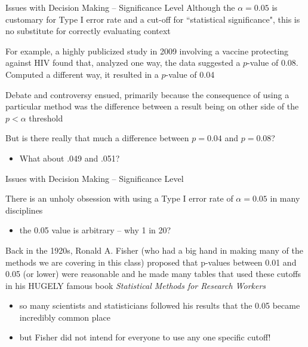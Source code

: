 \documentclass{beamer}
\begin{document}
\begin{frame}{Issues with Decision Making -- Significance Level}
Although the $\alpha = 0.05$ is customary for Type I error rate and a cut-off for ``statistical significance", this is no substitute for correctly evaluating context \vspace{5mm}

For example, a highly publicized study in 2009 involving a vaccine protecting against HIV found that, analyzed one way, the data suggested a $p$-value of 0.08. Computed a different way, it resulted in a $p$-value of 0.04 \vspace{5mm}

Debate and controversy ensued, primarily because the consequence of using a particular method was the difference between a result being on other side of the $p < \alpha$ threshold \vspace{5mm}

But is there really that much a difference between $p = 0.04$ and $p = 0.08$?

\begin{itemize}
    \item What about .049 and .051?
\end{itemize}
\end{frame}

\begin{frame}{Issues with Decision Making -- Significance Level}

There is an unholy obsession with using a Type I error rate of $\alpha = 0.05$ in many disciplines
\begin{itemize}
    \item the 0.05 value is arbitrary -- why 1 in 20?
\end{itemize} \vspace{4mm}

Back in the 1920s, Ronald A. Fisher (who had a big hand in making many of the methods we are covering in this class) proposed that p-values between 0.01 and 0.05 (or lower) were reasonable and he made many tables that used these cutoffs in his HUGELY famous book \textit{Statistical Methods for Research Workers}
\begin{itemize}
    \item so many scientists and statisticians followed his results that the 0.05 became incredibly common place
    \item but Fisher did not intend for everyone to use any one specific cutoff!
\end{itemize}
\end{frame}
\end{document}
